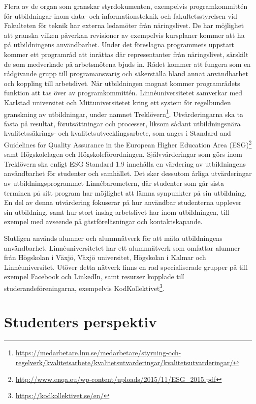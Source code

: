 Flera av de organ som granskar styrdokumenten, exempelvis programkommittén för utbildningar inom data- och informationsteknik och fakultetsstyrelsen vid Fakulteten för teknik har externa ledamöter från näringslivet. De har möjlighet att granska vilken påverkan revisioner av exempelvis kursplaner kommer att ha på utbildningens användbarhet. Under det föreslagna programmets uppstart kommer ett programråd att inrättas där representanter från näringslivet, särskilt de som medverkade på arbetsmötena bjuds in. Rådet kommer att fungera som en rådgivande grupp till programansvarig och säkerställa bland annat användbarhet och koppling till arbetslivet. När utbildningen mognat kommer programrådets funktion att tas över av programkommittén. Linnéuniversitetet samverkar med Karlstad universitet och Mittuniversitetet kring ett system för regelbunden granskning av utbildningar, under namnet Treklövern\footnote{\url{https://medarbetare.lnu.se/medarbetare/styrning-och-regelverk/kvalitetsarbete/kvalitetsutvarderingar/kvalitetsutvarderingar/}}. Utvärderingarna ska ta fasta på resultat, förutsättningar och processer, liksom sådant utbildningsnära kvalitetssäkrings- och kvalitetsutvecklingsarbete, som anges i Standard and Guidelines for Quality Assurance in the European Higher Education Area (ESG)\footnote{\url{http://www.enqa.eu/wp-content/uploads/2015/11/ESG_2015.pdf}} samt Högskolelagen och Högskoleförordningen. Självvärderingar som görs inom Treklövern ska enligt ESG Standard 1.9 innehålla en värdering av utbildningens användbarhet för studenter och samhället. Det sker dessutom årliga utvärderingar av utbildningsprogrammet Linnébarometern, där studenter som går sista terminen på sitt program har möjlighet att lämna synpunkter på sin utbildning. En del av denna utvärdering fokuserar på hur användbar studenterna upplever sin utbildning, samt hur stort inslag arbetslivet har inom utbildningen, till exempel med avseende på gästföreläsningar och kontaktskapande.

Slutligen används alumner och alumnnätverk för att mäta utbildningens användbarhet. Linnéuniversitetet har ett alumnnätverk som omfattar alumner från Högskolan i Växjö, Växjö universitet, Högskolan i Kalmar och Linnéuniversitet. Utöver detta nätverk finns en rad specialiserade grupper på till exempel Facebook och LinkedIn, samt resurser kopplade till studerandeföreningarna, exempelvis KodKollektivet\footnote{\url{https://kodkollektivet.se/en/}}. 

\section{Studenters perspektiv}

